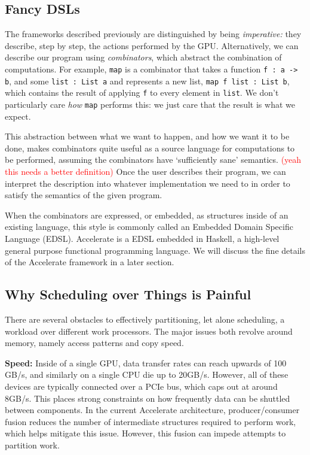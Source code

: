 \documentclass[a4paper,12pt]{article}
\newcommand{\red}[1]{\textcolor{red}{#1}}
\begin{document}
\begin{multicols}{2}
\subsection{Fancy DSLs}

The frameworks described previously are distinguished by being \textit{imperative:} they describe, step by step, the actions performed by the GPU. Alternatively, we can describe our program using \textit{combinators}, which abstract the combination of computations. For example, \texttt{map} is a combinator that takes a function \texttt{f : a -> b}, and some \texttt{list : List a} and represents a new list, \texttt{map f list : List b}, which contains the result of applying \texttt{f} to every element in \texttt{list}. We don't particularly care \textit{how} \texttt{map} performs this: we just care that the result is what we expect.

This abstraction between what we want to happen, and how we want it to be done, makes combinators quite useful as a source language for computations to be performed, assuming the combinators have `sufficiently sane' semantics. \red{(yeah this needs a better definition)} Once the user describes their program, we can interpret the description into whatever implementation we need to in order to satisfy the semantics of the given program.

When the combinators are expressed, or embedded, as structures inside of an existing language, this style is commonly called an Embedded Domain Specific Language (EDSL). Accelerate is a EDSL embedded in Haskell, a high-level general purpose functional programming language. We will discuss the fine details of the Accelerate framework in a later section.

\subsection{Why Scheduling over Things is Painful}

There are several obstacles to effectively partitioning, let alone scheduling, a workload over different work processors. The major issues both revolve around memory, namely access patterns and copy speed. 

\textbf{Speed:} Inside of a single GPU, data transfer rates can reach upwards of 100 GB/s, and similarly on a single CPU die up to 20GB/s. However, all of these devices are typically connected over a PCIe bus, which caps out at around 8GB/s. This places strong constraints on how frequently data can be shuttled between components. In the current Accelerate architecture, producer/consumer fusion reduces the number of intermediate structures required to perform work, which helps mitigate this issue. However, this fusion can impede attempts to partition work.


\end{multicols}
\end{document}
